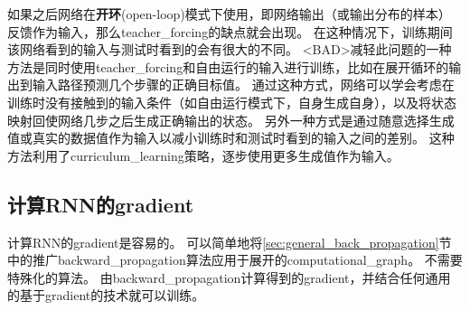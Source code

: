 
如果之后网络在\textbf{开环}(open-loop)模式下使用，即网络输出（或输出分布的样本）反馈作为输入，那么\gls{teacher_forcing}的缺点就会出现。
在这种情况下，训练期间该网络看到的输入与测试时看到的会有很大的不同。
<BAD>减轻此问题的一种方法是同时使用\gls{teacher_forcing}和自由运行的输入进行训练，比如在展开循环的输出到输入路径预测几个步骤的正确目标值。
通过这种方式，网络可以学会考虑在训练时没有接触到的输入条件（如自由运行模式下，自身生成自身），以及将状态映射回使网络几步之后生成正确输出的状态。
另外一种方式\citep{SamyBengio-et-al-arxiv2015}是通过随意选择生成值或真实的数据值作为输入以减小训练时和测试时看到的输入之间的差别。
这种方法利用了\gls{curriculum_learning}策略，逐步使用更多生成值作为输入。


\subsection{计算\gls{RNN}的\gls{gradient}}
\label{sec:computing_the_gradient_in_a_recurrent_neural_network}
计算\gls{RNN}的\gls{gradient}是容易的。
可以简单地将\ref{sec:general_back_propagation}节中的推广\gls{backward_propagation}算法应用于展开的\gls{computational_graph}。
不需要特殊化的算法。
由\gls{backward_propagation}计算得到的\gls{gradient}，并结合任何通用的基于\gls{gradient}的技术就可以训练。

